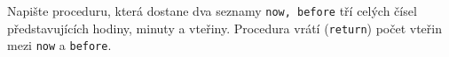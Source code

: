 \question[30]
Napište proceduru, která dostane dva seznamy \texttt{now, before} tří celých
čísel představujících hodiny, minuty a vteřiny. Procedura vrátí
(\texttt{return}) počet vteřin mezi \texttt{now} a \texttt{before}.